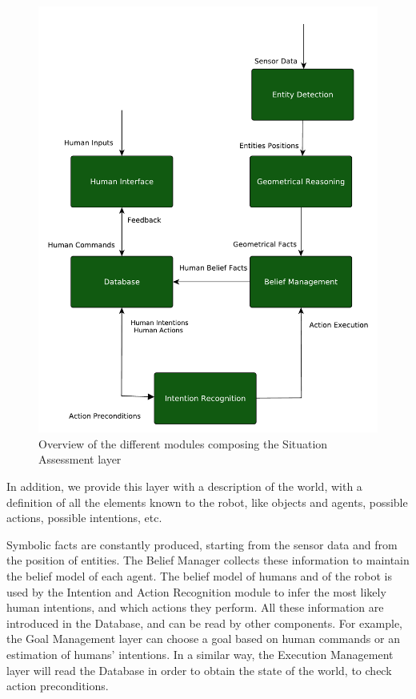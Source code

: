  \begin{figure}[ht!]
	\centering
	\includegraphics[scale=0.45]{img/situation_assessment/situation_assessment_overview}
	\caption{Overview of the different modules composing the Situation Assessment layer}
	\label{fig:situation_assessment-situation_assessment_overview}
\end{figure}

In addition, we provide this layer with a description of the world, with a definition of all the elements known to the robot, like objects and agents, possible actions, possible intentions, etc. 

Symbolic facts are constantly produced, starting from the sensor data and from the position of entities. The Belief Manager collects these information to maintain the belief model of each agent. The belief model of humans and of the robot is used by the Intention and Action Recognition module to infer the most likely human intentions, and which actions they perform. All these information are introduced in the Database, and can be read by other components. For example, the Goal Management layer can choose a goal based on human commands or an estimation of humans' intentions. In a similar way, the Execution Management layer will read the Database in order to obtain the state of the world, to check action preconditions.  

